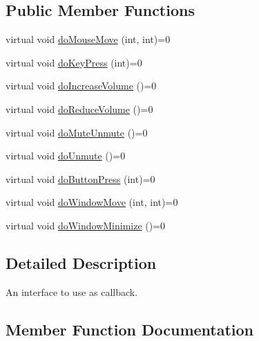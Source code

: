 \subsection*{Public Member Functions}
\begin{DoxyCompactItemize}
\item 
virtual void \hyperlink{classDisplayControlCallbackInterface_ab7abee0745e5313dc50fe33c0206310a}{do\+Mouse\+Move} (int, int)=0
\item 
virtual void \hyperlink{classDisplayControlCallbackInterface_afdf32e210ff484bfd669b9de84c94dba}{do\+Key\+Press} (int)=0
\item 
virtual void \hyperlink{classDisplayControlCallbackInterface_a78d7afe70cf3d2f524824efe087f0069}{do\+Increase\+Volume} ()=0
\item 
virtual void \hyperlink{classDisplayControlCallbackInterface_ac84cb33c6ffa7e818269e664d00fda6d}{do\+Reduce\+Volume} ()=0
\item 
virtual void \hyperlink{classDisplayControlCallbackInterface_a2826e548e2701baa4990422e0671b233}{do\+Mute\+Unmute} ()=0
\item 
virtual void \hyperlink{classDisplayControlCallbackInterface_a24be31ca23631717ac789f2e98467015}{do\+Unmute} ()=0
\item 
virtual void \hyperlink{classDisplayControlCallbackInterface_a55f329e2ab41d237f03b166349d2467e}{do\+Button\+Press} (int)=0
\item 
virtual void \hyperlink{classDisplayControlCallbackInterface_af8f01d480c76ee88d2719a246b5d4135}{do\+Window\+Move} (int, int)=0
\item 
virtual void \hyperlink{classDisplayControlCallbackInterface_a5457bccb953df7296b81b96db827896c}{do\+Window\+Minimize} ()=0
\end{DoxyCompactItemize}


\subsection{Detailed Description}
An interface to use as callback. 

\subsection{Member Function Documentation}
\mbox{\label{classDisplayControlCallbackInterface_a55f329e2ab41d237f03b166349d2467e}} 
